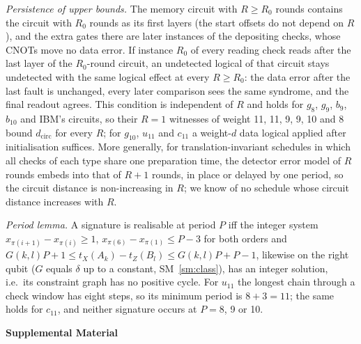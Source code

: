 \documentclass[aps,prl,twocolumn,superscriptaddress,nofootinbib]{revtex4-2}
\newif\ifshowclaimtags \showclaimtagsfalse
\newcommand{\cl}[1]{\ifshowclaimtags\textsuperscript{\textcolor{blue}{\scriptsize[#1]}}\fi}
\newcommand{\dcirc}{d_{\mathrm{circ}}}
\begin{document}
\emph{Persistence of upper bounds.} The memory circuit with $R\ge R_0$ rounds contains the
circuit with $R_0$ rounds as its first layers (the start offsets do not depend on $R$),
and the extra gates there are later instances of the depositing checks, whose CNOTs move no
data error. If instance $R_0$ of every reading check reads after the last layer of the
$R_0$-round circuit, an undetected logical of that circuit stays undetected with the same
logical effect at every $R\ge R_0$: the data error after the last fault is unchanged, every
later comparison sees the same syndrome, and the final readout agrees. This condition is
independent of $R$ and holds for $g_8$, $g_9$, $b_9$, $b_{10}$ and IBM's circuits, so their
$R=1$ witnesses of weight 11, 11, 9, 9, 10 and 8 bound $\dcirc$ for every $R$; for $g_{10}$,
$u_{11}$ and $c_{11}$ a weight-$d$ data logical applied after initialisation
suffices\cl{L-4,L-23}. More generally, for translation-invariant schedules in which all
checks of each type share one preparation time, the detector error model of $R$ rounds
embeds into that of $R+1$ rounds, in place or delayed by one period, so the circuit distance
is non-increasing in $R$; we know of no schedule whose circuit distance increases with $R$.

\emph{Period lemma.} A signature is realisable at period $P$ iff the integer system
$x_{\pi(i+1)}-x_{\pi(i)}\ge1$, $x_{\pi(6)}-x_{\pi(1)}\le P-3$ for both orders and
$G(k,l)P+1\le t_X(A_k)-t_Z(B_l)\le G(k,l)P+P-1$, likewise on the right qubit ($G$ equals
$\delta$ up to a constant, SM~\ref{sm:class}), has an integer solution, i.e.\ its constraint
graph has no positive cycle. For $u_{11}$ the longest chain through a check window has
eight steps, so its minimum period is $8+3=11$; the same holds for $c_{11}$, and neither
signature occurs at $P=8$, 9 or 10\cl{L-16}.

\clearpage
\onecolumngrid
\begin{center}
\textbf{\large Supplemental Material}
\end{center}
\setcounter{secnumdepth}{1}
\setcounter{section}{0}
\renewcommand{\thesection}{S\arabic{section}}
\setcounter{table}{0}
\renewcommand{\thetable}{S\arabic{table}}
\renewcommand{\theHtable}{S\arabic{table}}
\setcounter{figure}{0}
\renewcommand{\thefigure}{S\arabic{figure}}
\renewcommand{\theHfigure}{S\arabic{figure}}
\setcounter{equation}{0}
\renewcommand{\theequation}{S\arabic{equation}}
\renewcommand{\theHequation}{S\arabic{equation}}
\end{document}
